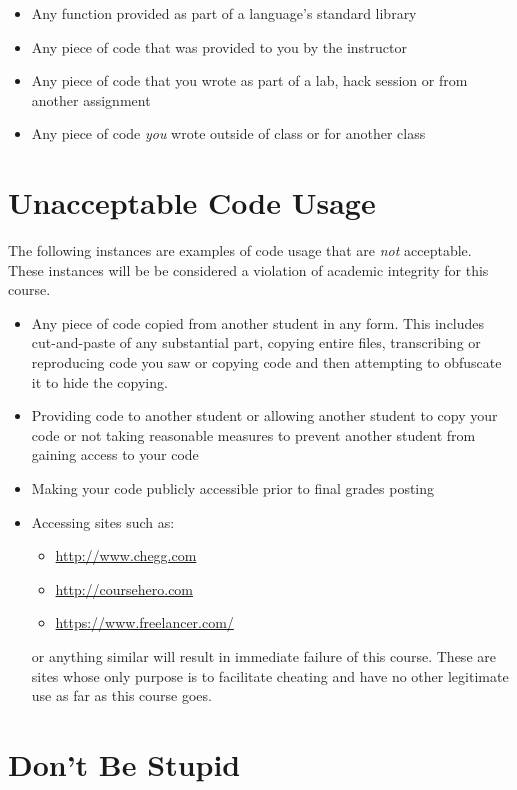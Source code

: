 \documentclass[12pt]{scrartcl}
\begin{document}
\begin{itemize}
  \item Any function provided as part of a language's standard library
  \item Any piece of code that was provided to you by the instructor
  \item Any piece of code that you wrote as part of a lab, hack session or from another assignment
  \item Any piece of code \emph{you} wrote outside of class or for another class
\end{itemize}

\section*{Unacceptable Code Usage}

The following instances are examples of code usage that are \emph{not}
acceptable.  These instances will be be considered a violation of academic 
integrity for this course.

\begin{itemize}
  \item Any piece of code copied from another student in any form.  This
  includes cut-and-paste of any substantial part, copying entire files, 
  transcribing or reproducing code you saw or copying code and then attempting
  to obfuscate it to hide the copying.
  \item Providing code to another student or allowing another student to copy your code or not taking reasonable measures to prevent another student from gaining access to your code
  \item Making your code publicly accessible prior to final grades posting
  \item Accessing sites such as:
  \begin{itemize}
    \item \url{http://www.chegg.com}
    \item \url{http://coursehero.com}
    \item \url{https://www.freelancer.com/} 
  \end{itemize}
  or anything similar will result in immediate failure of this course.  These
  are sites whose only purpose is to facilitate cheating and have no other 
  legitimate use as far as this course goes.
\end{itemize}

\section*{Don't Be Stupid}
\end{document}
